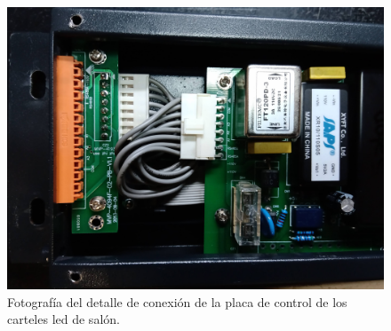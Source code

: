 \begin{figure}[ht]
	\centering
	\includegraphics[width=1\textwidth]{./Figures/displayController.jpg}
	\caption{Fotografía del detalle de conexión de la placa de control de los carteles led de salón.}
	\label{fig:displayController}
\end{figure}
